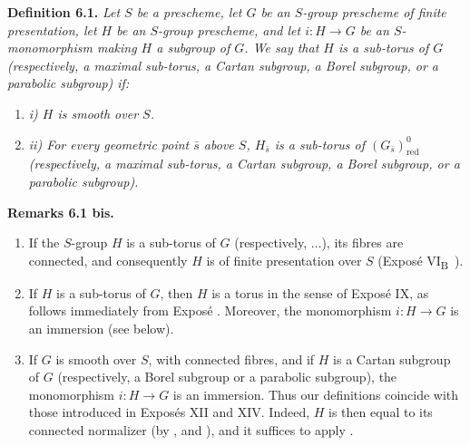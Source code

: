 \textbf{Definition 6.1.} \emph{Let \(S\) be a prescheme, let \(G\)
be an \(S\)-group prescheme of finite presentation, let \(H\) be an
\(S\)-group prescheme, and let \(i:H\to G\) be an
\(S\)-monomorphism making \(H\) a subgroup of \(G\). We say that
\(H\) is a sub-torus of \(G\) (respectively, a maximal sub-torus, a
Cartan subgroup, a Borel subgroup, or a parabolic subgroup) if:}

\begin{enumerate}
\renewcommand{\labelenumi}{\textup{\roman{enumi})}}
\item
  \emph{i) \(H\) is smooth over \(S\).}
\item
  \emph{ii) For every geometric point \(\bar s\) above \(S\),
  \(H_{\bar s}\) is a sub-torus of
  \((G_{\bar s})^{0}_{\mathrm{red}}\) (respectively, a maximal
  sub-torus, a Cartan subgroup, a Borel subgroup, or a parabolic
  subgroup).}
\end{enumerate}

\textbf{Remarks 6.1 bis.}

\begin{enumerate}
\renewcommand{\labelenumi}{\textup{\alph{enumi})}}
\item
  If the \(S\)-group \(H\) is a sub-torus of \(G\)
  (respectively, \(\ldots\)), its fibres are connected, and
  consequently \(H\) is of finite presentation over \(S\) (Exposé
  VI\textsubscript{B}~).
\item
  If \(H\) is a sub-torus of \(G\), then \(H\) is a torus in the
  sense of Exposé IX, as follows immediately from Exposé .
  Moreover, the monomorphism \(i:H\to G\) is an immersion (see 
  below).
\item
  If \(G\) is smooth over \(S\), with connected fibres, and if
  \(H\) is a Cartan subgroup of \(G\) (respectively, a Borel
  subgroup or a parabolic subgroup), the monomorphism \(i:H\to G\)
  is an immersion. Thus our definitions coincide with those
  introduced in Exposés XII and XIV. Indeed, \(H\) is then equal to
  its connected normalizer (by ,  and ),
  and it suffices to apply .
\end{enumerate}

